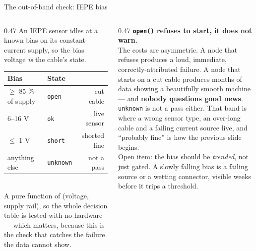 \documentclass[aspectratio=169,10pt]{beamer}
\begin{document}
\begin{frame}{The out-of-band check: IEPE bias}
  \begin{columns}[T]
    \begin{column}{0.47\textwidth}
      \scriptsize
      An IEPE sensor idles at a known bias on its constant-current supply, so
      the bias voltage \emph{is} the cable's state.
      \\[2mm]
      \begin{tabular}{@{}llr@{}}
        \toprule
        \textbf{Bias} & \textbf{State} & \\
        \midrule
        $\geq$ 85 \% of supply & \texttt{open}   & cut cable \\
        6--16 V                & \texttt{ok}     & live sensor \\
        $\leq$ 1 V             & \texttt{short}  & shorted line \\
        anything else          & \texttt{unknown} & \textcolor{pdmcrit}{not a pass} \\
        \bottomrule
      \end{tabular}
      \\[2mm]
      A pure function of (voltage, supply rail), so the whole decision table is
      tested with no hardware --- which matters, because this is the check that
      catches the failure the data cannot show.
    \end{column}
    \begin{column}{0.47\textwidth}
      \scriptsize
      \textbf{\texttt{open()} refuses to start, it does not warn.}
      \\[1mm]
      The costs are asymmetric. A node that refuses produces a loud, immediate,
      correctly-attributed failure. A node that starts on a cut cable produces
      months of data showing a beautifully smooth machine --- and
      \textbf{nobody questions good news}.
      \\[2mm]
      \texttt{unknown} is not a pass either. That band is where a wrong sensor
      type, an over-long cable and a failing current source live, and
      ``probably fine'' is how the previous slide begins.
      \\[2mm]
      \color{pdmink2}
      Open item: the bias should be \emph{trended}, not just gated. A slowly
      falling bias is a failing source or a wetting connector, visible weeks
      before it trips a threshold.
    \end{column}
  \end{columns}
\end{frame}
\end{document}
